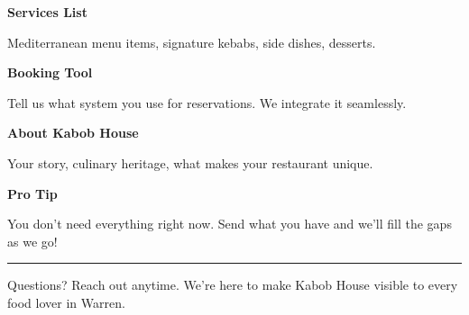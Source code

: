 \documentclass[11pt,letterpaper]{article}
\begin{document}
\hfill
\begin{minipage}[t]{0.48\textwidth}
\begin{tcolorbox}[colframe=accent-teal, boxrule=1pt, left=0.7em, right=0.7em, top=0.5em, bottom=0.5em, arc=4pt, boxsep=0pt]
{\bfseries\small\color{accent-teal}Services List}

\vspace{0.15em}

{\small Mediterranean menu items, signature kebabs, side dishes, desserts.}
\end{tcolorbox}

\vspace{0.1em}

\begin{tcolorbox}[colframe=accent-teal, boxrule=1pt, left=0.7em, right=0.7em, top=0.5em, bottom=0.5em, arc=4pt, boxsep=0pt]
{\bfseries\small\color{accent-teal}Booking Tool}

\vspace{0.15em}

{\small Tell us what system you use for reservations. We integrate it seamlessly.}
\end{tcolorbox}

\vspace{0.1em}

\begin{tcolorbox}[colframe=accent-teal, boxrule=1pt, left=0.7em, right=0.7em, top=0.5em, bottom=0.5em, arc=4pt, boxsep=0pt]
{\bfseries\small\color{accent-teal}About Kabob House}

\vspace{0.15em}

{\small Your story, culinary heritage, what makes your restaurant unique.}
\end{tcolorbox}

\vspace{-0.2em}
\end{minipage}

\vspace{0.15em}

\begin{tcolorbox}[colback={accent-red!5}, colframe=accent-red!20, boxrule=0.5pt, left=0.7em, right=0.7em, top=0.4em, bottom=0.4em, arc=6pt, boxsep=0pt]

{\bfseries\small\color{accent-red}Pro Tip}

\vspace{0.1em}

{\small You don't need everything right now. Send what you have and we'll fill the gaps as we go!}

\end{tcolorbox}

\vspace{0.15em}

\noindent\hrule
\vspace{0.2em}

{\small\color{text-light}Questions? Reach out anytime. We're here to make Kabob House visible to every food lover in Warren.}
\end{document}
